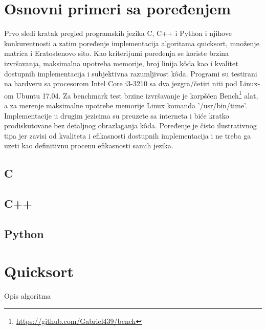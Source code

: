 \documentclass[12pt,oneside]{memoir}
\begin{document}
\section{Osnovni primeri sa poređenjem}
Prvo sledi kratak pregled programskih jezika C, C++ i Python i njihove konkurentnosti a zatim poređenje implementacija algoritama quicksort, množenje matrica i Eratostenovo sito. Kao kriterijumi poređenja se koriste brzina izvršavanja, maksimalna upotreba memorije, broj linija k\^{o}da kao i kvalitet dostupnih implementacija i subjektivna razumljivost  k\^{o}da. Programi su testirani na hardveru sa procesorom Intel Core i3-3210 sa dva jezgra/četiri niti pod Linux-om Ubuntu 17.04. Za benchmark test brzine izvršavanje je korpšćen Bench\footnote{\url{https://github.com/Gabriel439/bench}} alat, a za merenje maksimalne upotrebe memorije Linux komanda '/usr/bin/time'. Implementacije u drugim jezicima su preuzete sa interneta i biće kratko prodiskutovane bez detaljnog obrazlaganja k\^{o}da. Poređenje je čisto ilustrativnog tipa jer zavisi od kvaliteta i efikasnosti dostupnih implementacija i ne treba ga uzeti kao definitivnu procenu efikasnosti samih jezika. 

\subsection{C}

\subsection{C++}

\subsection{Python}

\section{Quicksort}
Opis algoritma
\end{document}
